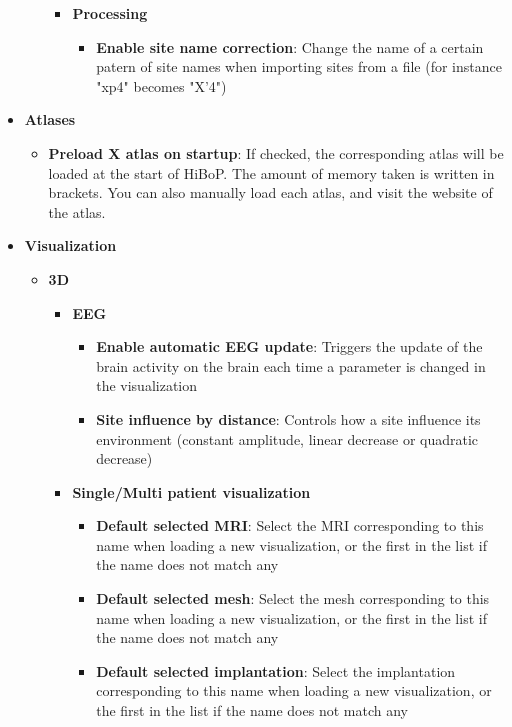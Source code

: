 \documentclass[a4paper]{article}
\begin{document}
\begin{itemize}
\begin{itemize}
\begin{itemize}
\begin{itemize}
\end{itemize}
\item \textbf{Processing}
\begin{itemize}
\item \textbf{Enable site name correction}: Change the name of a certain patern of site names when importing sites from a file (for instance "xp4" becomes "X'4")
\end{itemize}
\end{itemize}
\end{itemize}
\item \textbf{Atlases}
\begin{itemize}
\item \textbf{Preload X atlas on startup}: If checked, the corresponding atlas will be loaded at the start of HiBoP. The amount of memory taken is written in brackets. You can also manually load each atlas, and visit the website of the atlas.
\end{itemize}
\item \textbf{Visualization}
\begin{itemize}
\item \textbf{3D}
\begin{itemize}
\item \textbf{EEG}
\begin{itemize}
\item \textbf{Enable automatic EEG update}: Triggers the update of the brain activity on the brain each time a parameter is changed in the visualization
\item \textbf{Site influence by distance}: Controls how a site influence its environment (constant amplitude, linear decrease or quadratic decrease)
\end{itemize}
\item \textbf{Single/Multi patient visualization}
\begin{itemize}
\item \textbf{Default selected MRI}: Select the MRI corresponding to this name when loading a new visualization, or the first in the list if the name does not match any
\item \textbf{Default selected mesh}: Select the mesh corresponding to this name when loading a new visualization, or the first in the list if the name does not match any
\item \textbf{Default selected implantation}: Select the implantation corresponding to this name when loading a new visualization, or the first in the list if the name does not match any
\end{itemize}

\end{itemize}
\end{itemize}
\end{itemize}
\end{document}
